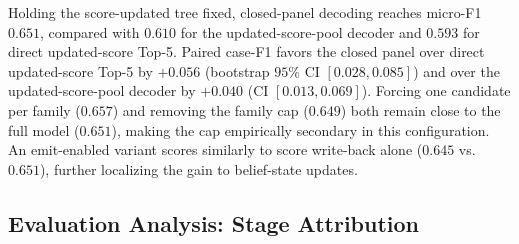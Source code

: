 \documentclass[letterpaper]{article} %
\begin{document}
Holding the score-updated tree fixed, closed-panel decoding reaches micro-F1 $0.651$, compared with $0.610$ for the updated-score-pool decoder and $0.593$ for direct updated-score Top-5.
Paired case-F1 favors the closed panel over direct updated-score Top-5 by $+0.056$ (bootstrap $95\%$ CI $[0.028,0.085]$) and over the updated-score-pool decoder by $+0.040$ (CI $[0.013,0.069]$).
Forcing one candidate per family ($0.657$) and removing the family cap ($0.649$) both remain close to the full model ($0.651$), making the cap empirically secondary in this configuration.
An emit-enabled variant scores similarly to score write-back alone ($0.645$ vs.\ $0.651$), further localizing the gain to belief-state updates.

\subsection{Evaluation Analysis: Stage Attribution}
\label{sec:res-tax}
\end{document}
